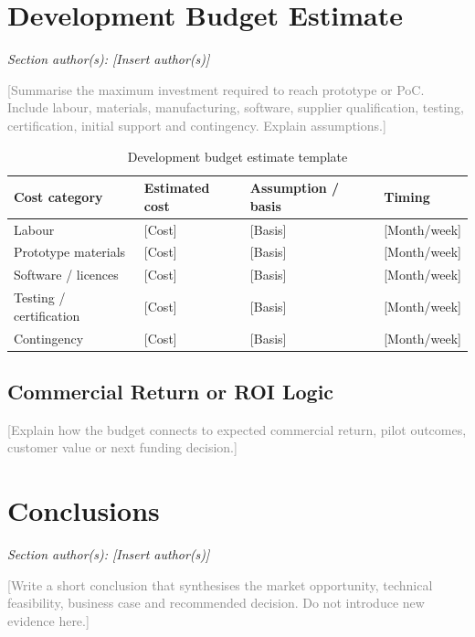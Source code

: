 \documentclass[11pt,a4paper]{article}
\newcommand{\placeholder}[1]{\textcolor{gray}{#1}}
\begin{document}
\section{Development Budget Estimate}
\textit{Section author(s): [Insert author(s)]}

\placeholder{[Summarise the maximum investment required to reach prototype or PoC. Include labour, materials, manufacturing, software, supplier qualification, testing, certification, initial support and contingency. Explain assumptions.]}

\begin{table}[H]
\centering
\caption{Development budget estimate template}
\footnotesize
\begin{tabularx}{\textwidth}{Y L{3cm}Y L{3cm}}
\toprule
\textbf{Cost category} & \textbf{Estimated cost} & \textbf{Assumption / basis} & \textbf{Timing} \\
\midrule
Labour & [Cost] & [Basis] & [Month/week] \\
Prototype materials & [Cost] & [Basis] & [Month/week] \\
Software / licences & [Cost] & [Basis] & [Month/week] \\
Testing / certification & [Cost] & [Basis] & [Month/week] \\
Contingency & [Cost] & [Basis] & [Month/week] \\
\bottomrule
\end{tabularx}
\end{table}

\subsection{Commercial Return or ROI Logic}
\placeholder{[Explain how the budget connects to expected commercial return, pilot outcomes, customer value or next funding decision.]}

\section{Conclusions}
\textit{Section author(s): [Insert author(s)]}

\placeholder{[Write a short conclusion that synthesises the market opportunity, technical feasibility, business case and recommended decision. Do not introduce new evidence here.]}

\clearpage

{}


\end{document}
